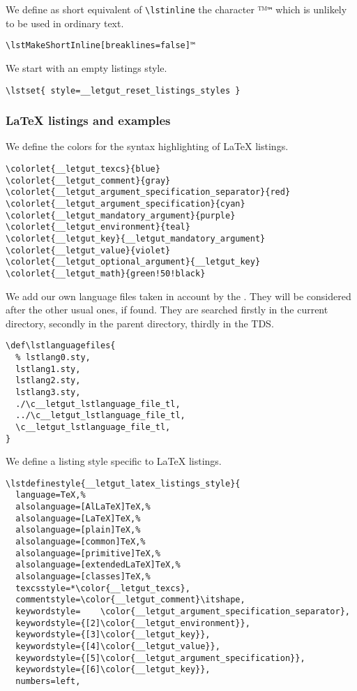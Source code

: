 \documentclass{letgut}
\begin{document}
We define as short equivalent of \lstinline+\lstinline+ the character
\lstDeleteShortInline™\texttt{™} which is unlikely to be used in ordinary text.

\begin{lstlisting}
\lstMakeShortInline[breaklines=false]™
\end{lstlisting}

We start with an empty listings style.

\begin{lstlisting}
\lstset{ style=__letgut_reset_listings_styles }
\end{lstlisting}

\subsubsection{\LaTeX{} listings and examples}
\label{ImplementationListingsLaTeXlistingsandexamples-xt4h55h0jlj0}
We define the colors for the syntax highlighting of \LaTeX{} listings.

\begin{lstlisting}
\colorlet{__letgut_texcs}{blue}
\colorlet{__letgut_comment}{gray}
\colorlet{__letgut_argument_specification_separator}{red}
\colorlet{__letgut_argument_specification}{cyan}
\colorlet{__letgut_mandatory_argument}{purple}
\colorlet{__letgut_environment}{teal}
\colorlet{__letgut_key}{__letgut_mandatory_argument}
\colorlet{__letgut_value}{violet}
\colorlet{__letgut_optional_argument}{__letgut_key}
\colorlet{__letgut_math}{green!50!black}
\end{lstlisting}

We add our own language files taken in account by the . They
will be considered after the other usual ones, if found. They are searched firstly
in the current directory, secondly in the parent directory, thirdly in the TDS.

\begin{lstlisting}
\def\lstlanguagefiles{
  % lstlang0.sty,
  lstlang1.sty,
  lstlang2.sty,
  lstlang3.sty,
  ./\c__letgut_lstlanguage_file_tl,
  ../\c__letgut_lstlanguage_file_tl,
  \c__letgut_lstlanguage_file_tl,
}
\end{lstlisting}

We define a listing style specific to \LaTeX{} listings.

\begin{lstlisting}
\lstdefinestyle{__letgut_latex_listings_style}{
  language=TeX,%
  alsolanguage=[AlLaTeX]TeX,%
  alsolanguage=[LaTeX]TeX,%
  alsolanguage=[plain]TeX,%
  alsolanguage=[common]TeX,%
  alsolanguage=[primitive]TeX,%
  alsolanguage=[extendedLaTeX]TeX,%
  alsolanguage=[classes]TeX,%
  texcsstyle=*\color{__letgut_texcs},
  commentstyle=\color{__letgut_comment}\itshape,
  keywordstyle=    \color{__letgut_argument_specification_separator},
  keywordstyle={[2]\color{__letgut_environment}},
  keywordstyle={[3]\color{__letgut_key}},
  keywordstyle={[4]\color{__letgut_value}},
  keywordstyle={[5]\color{__letgut_argument_specification}},
  keywordstyle={[6]\color{__letgut_key}},
  numbers=left,
\end{lstlisting}
\end{document}
